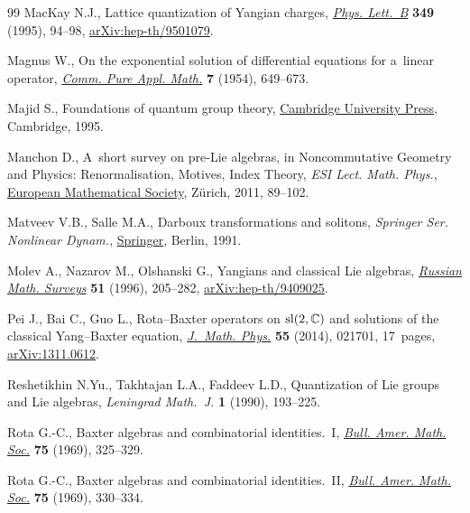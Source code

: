 \documentclass[pdftex]{sigma}
\numberwithin{equation}{section}
\newcounter{diff_order}
\newcounter{diff_power}
\theoremstyle{definition}
\begin{document}
\begin{thebibliography}{99}
MacKay N.J., Lattice quantization of {Y}angian charges,
 \href{https://doi.org/10.1016/0370-2693(95)00222-7}{\textit{Phys. Lett.~B}}
 \textbf{349} (1995), 94--98,
 \href{http://arxiv.org/abs/hep-th/9501079}{arXiv:hep-th/9501079}.

Magnus W., On the exponential solution of differential equations for a~linear
 operator, \href{https://doi.org/10.1002/cpa.3160070404}{\textit{Comm. Pure
 Appl. Math.}} \textbf{7} (1954), 649--673.

Majid S., Foundations of quantum group theory,
 \href{https://doi.org/10.1017/CBO9780511613104}{Cambridge University Press},
 Cambridge, 1995.

Manchon D., A~short survey on pre-{L}ie algebras, in Noncommutative Geometry
 and Physics: Renormalisation, Motives, Index Theory, \textit{ESI Lect. Math. Phys.},
 \href{https://doi.org/10.4171/008-1/3}{European Mathematical Society},
 Z\"urich, 2011, 89--102.

Matveev V.B., Salle M.A., Darboux transformations and solitons, \textit{Springer Ser. Nonlinear Dynam.}, \href{https://doi.org/10.1007/978-3-662-00922-2}{Springer},
 Berlin, 1991.

Molev A., Nazarov M., Olshanski G., Yangians and classical {L}ie algebras,
 \href{https://doi.org/10.1070/RM1996v051n02ABEH002772}{\textit{Russian Math.
 Surveys}} \textbf{51} (1996), 205--282,
 \href{http://arxiv.org/abs/hep-th/9409025}{arXiv:hep-th/9409025}.

Pei J., Bai C., Guo L., Rota--{B}axter operators on {${\rm sl}(2,{\mathbb C})$}
 and solutions of the classical {Y}ang--{B}axter equation,
 \href{https://doi.org/10.1063/1.4863898}{\textit{J.~Math. Phys.}} \textbf{55}
 (2014), 021701, 17~pages,
 \href{http://arxiv.org/abs/1311.0612}{arXiv:1311.0612}.

Reshetikhin N.Yu., Takhtajan L.A., Faddeev L.D., Quantization of {L}ie groups
 and {L}ie algebras, \textit{Leningrad Math.~J.} \textbf{1} (1990), 193--225.

Rota G.-C., Baxter algebras and combinatorial identities.~{I},
 \href{https://doi.org/10.1090/S0002-9904-1969-12156-7}{\textit{Bull. Amer.
 Math. Soc.}} \textbf{75} (1969), 325--329.

Rota G.-C., Baxter algebras and combinatorial identities.~{II},
 \href{https://doi.org/10.1090/S0002-9904-1969-12158-0}{\textit{Bull. Amer.
 Math. Soc.}} \textbf{75} (1969), 330--334.


\end{thebibliography}
\end{document}
